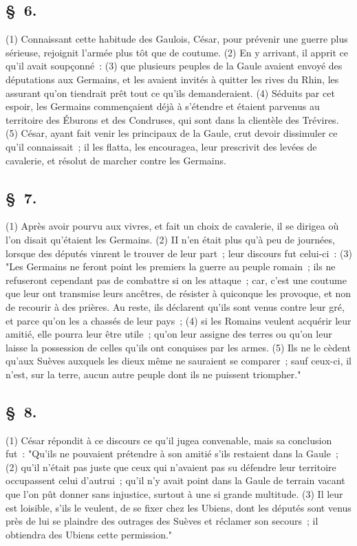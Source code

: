\documentclass[french,twoside]{book} %
\begin{document}
\subsection[{§ 6.}]{ \textsc{§ 6.} }
\noindent (1) Connaissant cette habitude des Gaulois, César, pour prévenir une guerre plus sérieuse, rejoignit l’armée plus tôt que de coutume. (2) En y arrivant, il apprit ce qu’il avait soupçonné : (3) que plusieurs peuples de la Gaule avaient envoyé des députations aux Germains, et les avaient invités à quitter les rives du Rhin, les assurant qu’on tiendrait prêt tout ce qu’ils demanderaient. (4) Séduits par cet espoir, les Germains commençaient déjà à s’étendre et étaient parvenus au territoire des Éburons et des Condruses, qui sont dans la clientèle des Trévires. (5) César, ayant fait venir les principaux de la Gaule, crut devoir dissimuler ce qu’il connaissait ; il les flatta, les encouragea, leur prescrivit des levées de cavalerie, et résolut de marcher contre les Germains.
\subsection[{§ 7.}]{ \textsc{§ 7.} }
\noindent (1) Après avoir pourvu aux vivres, et fait un choix de cavalerie, il se dirigea où l’on disait qu’étaient les Germains. (2) II n’en était plus qu’à peu de journées, lorsque des députés vinrent le trouver de leur part ; leur discours fut celui-ci : (3) "Les Germains ne feront point les premiers la guerre au peuple romain ; ils ne refuseront cependant pas de combattre si on les attaque ; car, c’est une coutume que leur ont transmise leurs ancêtres, de résister à quiconque les provoque, et non de recourir à des prières. Au reste, ils déclarent qu’ils sont venus contre leur gré, et parce qu’on les a chassés de leur pays ; (4) si les Romains veulent acquérir leur amitié, elle pourra leur être utile ; qu’on leur assigne des terres ou qu’on leur laisse la possession de celles qu’ils ont conquises par les armes. (5) Ils ne le cèdent qu’aux Suèves auxquels les dieux même ne sauraient se comparer ; sauf ceux-ci, il n’est, sur la terre, aucun autre peuple dont ils ne puissent triompher."
\subsection[{§ 8.}]{ \textsc{§ 8.} }
\noindent (1) César répondit à ce discours ce qu’il jugea convenable, mais sa conclusion fut : "Qu'ils ne pouvaient prétendre à son amitié s’ils restaient dans la Gaule ; (2) qu’il n’était pas juste que ceux qui n’avaient pas su défendre leur territoire occupassent celui d’autrui ; qu’il n’y avait point dans la Gaule de terrain vacant que l’on pût donner sans injustice, surtout à une si grande multitude. (3) Il leur est loisible, s’ils le veulent, de se fixer chez les Ubiens, dont les députés sont venus près de lui se plaindre des outrages des Suèves et réclamer son secours ; il obtiendra des Ubiens cette permission."
\end{document}
